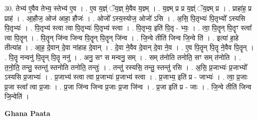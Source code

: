 \documentclass[17pt]{extarticle}
\begin{document}
30. तेभ्य॑ ए॒वैव तेभ्य॒ स्तेभ्य॑ ए॒व । . ए॒व य॒ज्ञ्ं ॅय॒ज्ञ् मे॒वैव य॒ज्ञ्म् । . य॒ज्ञ्म् प्र प्र य॒ज्ञ्ं ॅय॒ज्ञ्म् प्र । . प्राहा॑ह॒ प्र प्राह॑ । . आ॒हौज॒ ओज॑ आहा॒ हौजः॑ । . ओजो᳚ ऽस्य॒स्योज॒ ओजो॑ ऽसि । . अ॒सि॒ पि॒तृभ्यः॑ पि॒तृभ्यो᳚ ऽस्यसि पि॒तृभ्यः॑ । . पि॒तृभ्य॑ स्त्वा त्वा पि॒तृभ्यः॑ पि॒तृभ्य॑ स्त्वा । . पि॒तृभ्य॒ इति॑ पि॒तृ - भ्यः॒ । . त्वा॒ पि॒तॄन् पि॒तॄꣳ स्त्वा᳚ त्वा पि॒तॄन् । . पि॒तॄन् जि॑न्व जिन्व पि॒तॄन् पि॒तॄन् जि॑न्व । . जि॒न्वे तीति॑ जिन्व जि॒न्वे ति॑ । . इत्या॑ हा॒हे तीत्या॑ह । . आ॒ह॒ दे॒वान् दे॒वा ना॑हाह दे॒वान् । . दे॒वा ने॒वैव दे॒वान् दे॒वा ने॒व । . ए॒व पि॒तॄन् पि॒तॄ ने॒वैव पि॒तॄन् । . पि॒तॄ नन्वनु॑ पि॒तॄन् पि॒तॄ ननु॑ । . अनु॒ सꣳ स मन्वनु॒ सम् । . सम् त॑नोति तनोति॒ सꣳ सम् त॑नोति । . त॒नो॒ति॒ तन्तु॒ स्तन्तु॑ स्तनोति तनोति॒ तन्तुः॑ । . तन्तु॑ रस्यसि॒ तन्तु॒ स्तन्तु॑ रसि । . अ॒सि॒ प्र॒जाभ्यः॑ प्र॒जाभ्यो᳚ ऽस्यसि प्र॒जाभ्यः॑ । . प्र॒जाभ्य॑ स्त्वा त्वा प्र॒जाभ्यः॑ प्र॒जाभ्य॑ स्त्वा । . प्र॒जाभ्य॒ इति॑ प्र - जाभ्यः॑ । . त्वा॒ प्र॒जाः प्र॒जा स्त्वा᳚ त्वा प्र॒जाः । . प्र॒जा जि॑न्व जिन्व प्र॒जाः प्र॒जा जि॑न्व । . प्र॒जा इति॑ प्र - जाः । . जि॒न्वे तीति॑ जिन्व जि॒न्वेति॑ । \newline

\textbf{Ghana Paata } \newline
\end{document}
